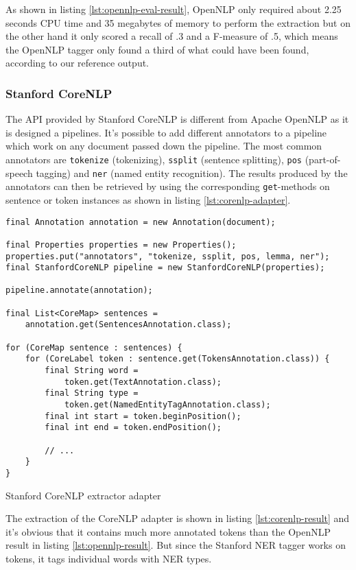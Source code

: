 As shown in listing \ref{lst:opennlp-eval-result}, OpenNLP only required about 2.25 seconds CPU time and 35 megabytes of memory to perform the extraction but on the other hand it only scored a recall of .3 and a F-measure of .5, which means the OpenNLP tagger only found a third of what could have been found, according to our reference output.

\subsubsection{Stanford CoreNLP}
The \gls{API} provided by Stanford CoreNLP is different from Apache OpenNLP as it is designed a pipelines. It's possible to add different annotators to a pipeline which work on any document passed down the pipeline. The most common annotators are \texttt{tokenize} (tokenizing), \texttt{ssplit} (sentence splitting), \texttt{pos} (part-of-speech tagging) and \texttt{ner} (named entity recognition). The results produced by the annotators can then be retrieved by using the corresponding \texttt{get}-methods on sentence or token instances as shown in listing \ref{lst:corenlp-adapter}.

\begin{listing}[H]
\begin{verbatim}
final Annotation annotation = new Annotation(document);

final Properties properties = new Properties();
properties.put("annotators", "tokenize, ssplit, pos, lemma, ner");
final StanfordCoreNLP pipeline = new StanfordCoreNLP(properties);

pipeline.annotate(annotation);

final List<CoreMap> sentences = 
    annotation.get(SentencesAnnotation.class);

for (CoreMap sentence : sentences) {
    for (CoreLabel token : sentence.get(TokensAnnotation.class)) {
        final String word = 
            token.get(TextAnnotation.class);
        final String type = 
            token.get(NamedEntityTagAnnotation.class);
        final int start = token.beginPosition();
        final int end = token.endPosition();

        // ...
    }
}
\end{verbatim}
\caption{Stanford CoreNLP extractor adapter}
\label{lst:corenlp-adapter}
\end{listing}

The extraction of the CoreNLP adapter is shown in listing \ref{lst:corenlp-result} and it's obvious that it contains much more annotated tokens than the OpenNLP result in listing \ref{lst:opennlp-result}. But since the Stanford \gls{NER} tagger works on tokens, it tags individual words with \gls{NER} types.

